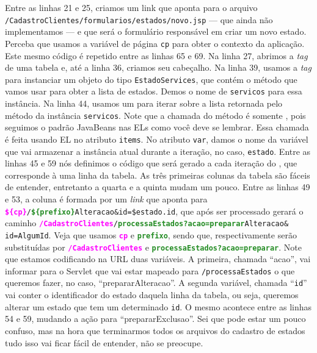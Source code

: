 Entre as linhas 21 e 25, criamos um link que aponta para o arquivo\linebreak%
\texttt{/CadastroClientes/formularios/estados/novo.jsp} --- que ainda não implementamos --- e que será o formulário responsável em criar um novo estado. Perceba que usamos a variável de página \texttt{cp} para obter o contexto da aplicação. Este mesmo código é repetido entre as linhas 65 e 69. Na linha 27, abrimos a \textit{tag} de uma tabela e, até a linha 36, criamos seu cabeçalho. Na linha 39, usamos a \textit{tag}  para instanciar um objeto do tipo \texttt{EstadoServices}, que contém o método que vamos usar para obter a lista de estados. Demos o nome de \texttt{servicos} para essa instância. Na linha 44, usamos um  para iterar sobre a lista retornada pelo método  da instância \texttt{servicos}. Note que a chamada do método  é somente , pois seguimos o padrão JavaBeans nas ELs como você deve se lembrar. Essa chamada é feita usando EL no atributo \texttt{items}. No atributo \texttt{var}, damos o nome da variável que vai armazenar a instância atual durante a iteração, no caso, \texttt{estado}. Entre as linhas 45 e 59 nós definimos o código que será gerado a cada iteração do , que corresponde à uma linha da tabela. As três primeiras colunas da tabela são fáceis de entender, entretanto a quarta e a quinta mudam um pouco. Entre as linhas 49 e 53, a coluna é formada por um \textit{link} que aponta para \texttt{\textbf{\textcolor{Fuchsia}{\$\{cp\}}}/\textbf{\textcolor{ForestGreen}{\$\{prefixo\}}}Alteracao\&id=\${estado.id}}, que após ser processado gerará o caminho \texttt{\textbf{\textcolor{Fuchsia}{/CadastroClientes}}/\textbf{\textcolor{ForestGreen}{processaEstados?acao=preparar}}Alteracao\&}\linebreak%
\texttt{id=AlgumId}. Veja que usamos \textcolor{Fuchsia}{\texttt{\textbf{cp}}} e \textcolor{ForestGreen}{\texttt{\textbf{prefixo}}}, sendo que, respectivamente serão substituídas por \textcolor{Fuchsia}{\texttt{\textbf{/CadastroClientes}}} e \textcolor{ForestGreen}{\texttt{\textbf{processaEstados?acao=preparar}}}. Note que estamos codificando na URL duas variáveis. A primeira, chamada ``acao'', vai informar para o Servlet que vai estar mapeado para \texttt{/processaEstados} o que queremos fazer, no caso, ``prepararAlteracao''. A segunda variável, chamada ``\texttt{id}'' vai conter o identificador do estado daquela linha da tabela, ou seja, queremos alterar um estado que tem um determinado \texttt{id}. O mesmo acontece entre as linhas 54 e 59, mudando a ação para ``prepararExclusao''. Sei que pode estar um pouco confuso, mas na hora que terminarmos todos os arquivos do cadastro de estados tudo isso vai ficar fácil de entender, não se preocupe.


